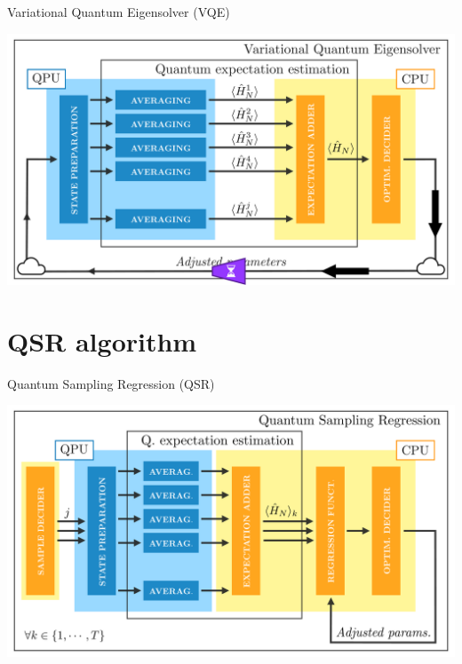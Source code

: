 \documentclass[9pt, handout, aspectratio=169]{beamer}	%
\begin{document}
\begin{frame}{Variational Quantum Eigensolver (VQE)}

	\begin{center}
		\includegraphics[width=.7\paperwidth]{Figures/VQE-bottleneck}
	\end{center}

\end{frame}


\section{QSR algorithm}

\begin{frame}{Quantum Sampling Regression (QSR)}

	\begin{center}
		\includegraphics[width=.7\paperwidth]{Figures/QSR}
	\end{center}

\end{frame}
\end{document}
